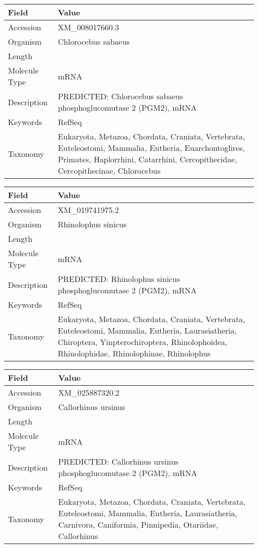 \documentclass[10pt]{article}
\begin{document}
\vspace{1em}
{\footnotesize
\begin{longtable}{>{\raggedright\arraybackslash}p{4.5cm} >{\raggedright\arraybackslash}p{11.5cm}}
\textbf{Field} & \textbf{Value} \\
\hline
Accession & XM\_008017660.3 \\
Organism & Chlorocebus sabaeus \\
Length & 2411 \\
Molecule Type & mRNA \\
Description & PREDICTED: Chlorocebus sabaeus phosphoglucomutase 2 (PGM2), mRNA \\
Keywords & RefSeq \\
Taxonomy & Eukaryota, Metazoa, Chordata, Craniata, Vertebrata, Euteleostomi, Mammalia, Eutheria, Euarchontoglires, Primates, Haplorrhini, Catarrhini, Cercopithecidae, Cercopithecinae, Chlorocebus \\
\end{longtable}
}

\vspace{1em}
{\footnotesize
\begin{longtable}{>{\raggedright\arraybackslash}p{4.5cm} >{\raggedright\arraybackslash}p{11.5cm}}
\textbf{Field} & \textbf{Value} \\
\hline
Accession & XM\_019741975.2 \\
Organism & Rhinolophus sinicus \\
Length & 6702 \\
Molecule Type & mRNA \\
Description & PREDICTED: Rhinolophus sinicus phosphoglucomutase 2 (PGM2), mRNA \\
Keywords & RefSeq \\
Taxonomy & Eukaryota, Metazoa, Chordata, Craniata, Vertebrata, Euteleostomi, Mammalia, Eutheria, Laurasiatheria, Chiroptera, Yinpterochiroptera, Rhinolophoidea, Rhinolophidae, Rhinolophinae, Rhinolophus \\
\end{longtable}
}

\vspace{1em}
{\footnotesize
\begin{longtable}{>{\raggedright\arraybackslash}p{4.5cm} >{\raggedright\arraybackslash}p{11.5cm}}
\textbf{Field} & \textbf{Value} \\
\hline
Accession & XM\_025887320.2 \\
Organism & Callorhinus ursinus \\
Length & 2593 \\
Molecule Type & mRNA \\
Description & PREDICTED: Callorhinus ursinus phosphoglucomutase 2 (PGM2), mRNA \\
Keywords & RefSeq \\
Taxonomy & Eukaryota, Metazoa, Chordata, Craniata, Vertebrata, Euteleostomi, Mammalia, Eutheria, Laurasiatheria, Carnivora, Caniformia, Pinnipedia, Otariidae, Callorhinus \\
\end{longtable}
}
\end{document}
